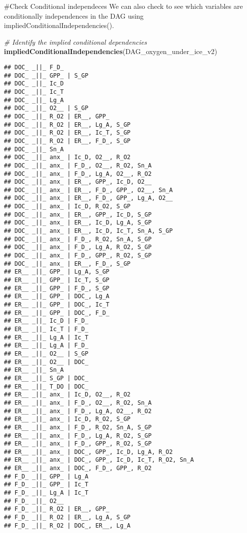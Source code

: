 \documentclass[
]{article}
\newenvironment{Shaded}{\begin{snugshade}}{\end{snugshade}}
\newcommand{\CommentTok}[1]{\textcolor[rgb]{0.56,0.35,0.01}{\textit{#1}}}
\newcommand{\FunctionTok}[1]{\textcolor[rgb]{0.13,0.29,0.53}{\textbf{#1}}}
\newcommand{\NormalTok}[1]{#1}
\begin{document}
\#Check Conditional independeces We can also check to see which
variables are conditionally independences in the DAG using
impliedConditionalIndependencies().

\begin{Shaded}
\begin{Highlighting}[]
\CommentTok{\# Identify the implied conditional dependencies}
\FunctionTok{impliedConditionalIndependencies}\NormalTok{(DAG\_oxygen\_under\_ice\_v2)}
\end{Highlighting}
\end{Shaded}

\begin{verbatim}
## DOC_ _||_ F_D_
## DOC_ _||_ GPP_ | S_GP
## DOC_ _||_ Ic_D
## DOC_ _||_ Ic_T
## DOC_ _||_ Lg_A
## DOC_ _||_ O2__ | S_GP
## DOC_ _||_ R_O2 | ER__, GPP_
## DOC_ _||_ R_O2 | ER__, Lg_A, S_GP
## DOC_ _||_ R_O2 | ER__, Ic_T, S_GP
## DOC_ _||_ R_O2 | ER__, F_D_, S_GP
## DOC_ _||_ Sn_A
## DOC_ _||_ anx_ | Ic_D, O2__, R_O2
## DOC_ _||_ anx_ | F_D_, O2__, R_O2, Sn_A
## DOC_ _||_ anx_ | F_D_, Lg_A, O2__, R_O2
## DOC_ _||_ anx_ | ER__, GPP_, Ic_D, O2__
## DOC_ _||_ anx_ | ER__, F_D_, GPP_, O2__, Sn_A
## DOC_ _||_ anx_ | ER__, F_D_, GPP_, Lg_A, O2__
## DOC_ _||_ anx_ | Ic_D, R_O2, S_GP
## DOC_ _||_ anx_ | ER__, GPP_, Ic_D, S_GP
## DOC_ _||_ anx_ | ER__, Ic_D, Lg_A, S_GP
## DOC_ _||_ anx_ | ER__, Ic_D, Ic_T, Sn_A, S_GP
## DOC_ _||_ anx_ | F_D_, R_O2, Sn_A, S_GP
## DOC_ _||_ anx_ | F_D_, Lg_A, R_O2, S_GP
## DOC_ _||_ anx_ | F_D_, GPP_, R_O2, S_GP
## DOC_ _||_ anx_ | ER__, F_D_, S_GP
## ER__ _||_ GPP_ | Lg_A, S_GP
## ER__ _||_ GPP_ | Ic_T, S_GP
## ER__ _||_ GPP_ | F_D_, S_GP
## ER__ _||_ GPP_ | DOC_, Lg_A
## ER__ _||_ GPP_ | DOC_, Ic_T
## ER__ _||_ GPP_ | DOC_, F_D_
## ER__ _||_ Ic_D | F_D_
## ER__ _||_ Ic_T | F_D_
## ER__ _||_ Lg_A | Ic_T
## ER__ _||_ Lg_A | F_D_
## ER__ _||_ O2__ | S_GP
## ER__ _||_ O2__ | DOC_
## ER__ _||_ Sn_A
## ER__ _||_ S_GP | DOC_
## ER__ _||_ T_DO | DOC_
## ER__ _||_ anx_ | Ic_D, O2__, R_O2
## ER__ _||_ anx_ | F_D_, O2__, R_O2, Sn_A
## ER__ _||_ anx_ | F_D_, Lg_A, O2__, R_O2
## ER__ _||_ anx_ | Ic_D, R_O2, S_GP
## ER__ _||_ anx_ | F_D_, R_O2, Sn_A, S_GP
## ER__ _||_ anx_ | F_D_, Lg_A, R_O2, S_GP
## ER__ _||_ anx_ | F_D_, GPP_, R_O2, S_GP
## ER__ _||_ anx_ | DOC_, GPP_, Ic_D, Lg_A, R_O2
## ER__ _||_ anx_ | DOC_, GPP_, Ic_D, Ic_T, R_O2, Sn_A
## ER__ _||_ anx_ | DOC_, F_D_, GPP_, R_O2
## F_D_ _||_ GPP_ | Lg_A
## F_D_ _||_ GPP_ | Ic_T
## F_D_ _||_ Lg_A | Ic_T
## F_D_ _||_ O2__
## F_D_ _||_ R_O2 | ER__, GPP_
## F_D_ _||_ R_O2 | ER__, Lg_A, S_GP
## F_D_ _||_ R_O2 | DOC_, ER__, Lg_A

\end{verbatim}
\end{document}
